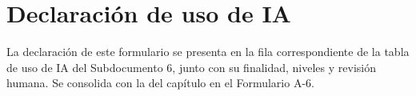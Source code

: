 \documentclass[carta,firma,final]{lafrox}
\begin{document}
\section*{Declaración de uso de IA}

La declaración de este formulario se presenta en la fila correspondiente de la tabla de uso de IA del Subdocumento 6, junto con su finalidad, niveles y revisión humana. Se consolida con la del capítulo en el Formulario A-6.
\end{document}
